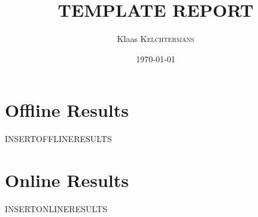 \documentclass{article}
\title{TEMPLATE REPORT} %
\author{Klaas \textsc{Kelchtermans}} %
\date{\today} %
\begin{document}
\maketitle %



\section{Offline Results}

INSERTOFFLINERESULTS



\section{Online Results}

INSERTONLINERESULTS

\end{document}
